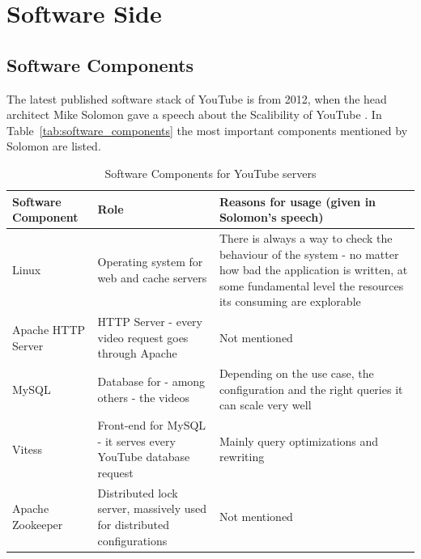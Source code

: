 \section{Software Side}
\label{sec:software_side}
\subsection{Software Components}

The latest published software stack of YouTube is from 2012, when the head architect Mike Solomon gave a speech about the Scalibility of YouTube \cite{misc:scalibility_at_youtube} \cite{misc:hihgscalibility}. In Table~\vref{tab:software_components} the most important components mentioned by Solomon are listed.

\begin{table}[htbp]
  \begin{center}
    \begin{tabularx}{\textwidth}{|p{}|p{}|X|}
      \hline
      \textbf{Software \newline Component} & \textbf{Role} & \textbf{Reasons for usage} \newline (given in Solomon's speech) \\
      \hline
      \hline
      Linux & Operating system for web and cache servers & There is always a way to check the behaviour of the system - no matter how bad the application is written, at some fundamental level the resources its consuming are explorable \\
      \hline
      Apache \newline HTTP Server & HTTP Server - every video request goes through Apache & Not mentioned \\
      \hline
      MySQL & Database for - among others - the videos & Depending on the use case, the configuration and the right queries it can scale very well \\
      \hline
      Vitess & Front-end for MySQL - it serves every YouTube database request & Mainly query optimizations and rewriting \\
      \hline
      Apache Zookeeper & Distributed lock server, massively used for distributed configurations & Not mentioned \\
      \hline
    \end{tabularx}
    \caption{Software Components for YouTube servers}
    \label{tab:software_components}
  \end{center}
\end{table}

